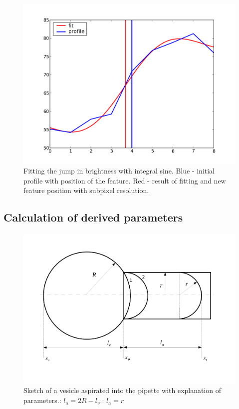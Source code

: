 \begin{figure}%
\includegraphics[width=\columnwidth]{figs/fitedge.pdf}%
\caption{Fitting the jump in brightness with integral sine. Blue - initial profile with position of the feature. Red - result of fitting and new feature position with subpixel resolution.}%
\label{fig:fitedge}%
\end{figure}

\subsection{Calculation of derived parameters}\label{results}

\begin{figure}%
\includegraphics[width=\columnwidth]{figs/pipettesketch.pdf}%
\caption{Sketch of a vesicle aspirated into the pipette with explanation of parameters.: $l_a = 2R-l_v$.: $l_a = r$}%
\label{fig:pipettesketch}%
\end{figure}

